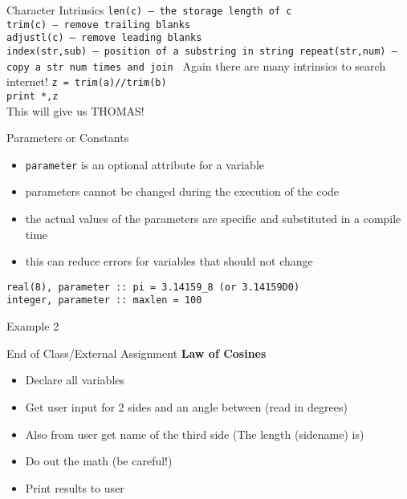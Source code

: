 \documentclass{beamer}
\begin{document}
\begin{frame}{Character Intrinsics}
\texttt{len(c) -- the storage length of c\\
  trim(c) -- remove trailing blanks\\
  adjustl(c) -- remove leading blanks\\
  index(str,sub) -- position of a substring in string
  repeat(str,num) -- copy a str num times and join
}
\vfill Again there are many intrinsics to search internet!
\vfill
\texttt{z = trim(a)//trim(b)} \\
\texttt{print *,z} \\
\vfill
This will give us THOMAS!
\end{frame}
\begin{frame}{Parameters or Constants}
  \begin{itemize}
    \item \texttt{parameter} is an optional attribute for a variable
    \vfill\item parameters cannot be changed during the execution of the code
    \vfill\item the actual values of the parameters are specific and substituted in a compile time
    \vfill\item this can reduce errors for variables that should not change
  \end{itemize}
\vfill
\texttt{real(8), parameter :: pi = 3.14159\_8 (or 3.14159D0) \\
	integer, parameter :: maxlen = 100}
\end{frame}
\begin{frame}
\begin{center}
\Huge{Example 2}
\end{center}
\end{frame}
\begin{frame}{End of Class/External Assignment}
\center\Large\textbf{Law of Cosines}
\normalsize
\begin{itemize}
  \vfill\item Declare all variables
  \vfill\item Get user input for 2 sides and an angle between (read in degrees)
  \vfill\item Also from user get name of the third side (The length (sidename) is)
  \vfill\item Do out the math (be careful!)
  \vfill\item Print results to user
\end{itemize}
\end{frame}
\end{document}

